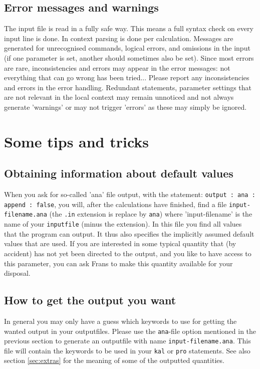 \documentclass{article}
\begin{document}
\subsection{Error messages and warnings}
The input file is read in a fully safe way.  This means a full syntax check on every input line is done. In context parsing is done per calculation. Messages are generated for unrecognised commands, logical errors, and omissions in the input (if one parameter is set, another should sometimes also be set).  Since most errors are rare, inconsistencies and errors may  appear in the error messages: not everything that can go wrong has been tried...  Please report any inconsistencies and errors in the error handling. Redundant statements, parameter settings that are not relevant in the local context may remain unnoticed and not always generate 'warnings' or may not trigger 'errors' as these may simply be ignored. 

\section{Some tips and tricks}

\subsection{Obtaining information about default values}
When you ask for so-called 'ana' file output, with the statement: 
{\tt output : ana : append : false},  you will, after the calculations have finished, find a file {\tt input-filename.ana} (the {\tt .in} extension is replace by {\tt ana}) where 'input-filename' is the name of your {\tt inputfile} (minus the extension). In this file you find all values that the program can output. It thus also specifies the implicitly assumed default values that are used. If you are interested in some typical quantity that (by accident) has not yet been directed to the output, and you like to have access to this parameter, you can ask Frans to make this quantity available for your disposal. 

\subsection{How to get the output you want}
In general you may only have a guess which keywords to use for getting the wanted output in your outputfiles. Please use the  {\tt ana}-file option mentioned in the previous section to generate an outputfile with name {\tt input-filename.ana}. This file will contain the keywords to be used in your {\tt kal} or {\tt pro} statements. See also section \ref{sec:extras} for the meaning of some of the outputted quantities. 
\end{document}
